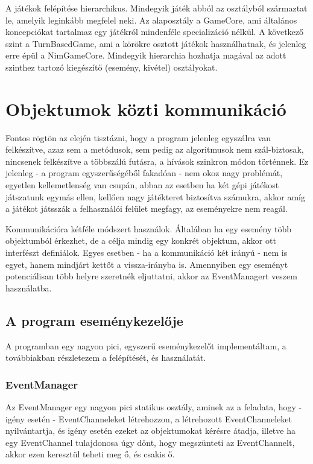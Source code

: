 A játékok felépítése hierarchikus. Mindegyik játék abból az osztályból származtat le, amelyik leginkább megfelel neki. Az alaposztály a GameCore, ami általános koncepciókat tartalmaz egy játékról mindenféle specializáció nélkül. A következő szint a TurnBasedGame, ami a körökre osztott játékok használhatnak, és jelenleg erre épül a NimGameCore. Mindegyik hierarchia hozhatja magával az adott szinthez tartozó kiegészítő (esemény, kivétel) osztályokat.

\section{Objektumok közti kommunikáció}
Fontos rögtön az elején tisztázni, hogy a program jelenleg egyszálra van felkészítve, azaz sem a metódusok, sem pedig az algoritmusok nem szál-biztosak, nincsenek felkészítve a többszálú futásra, a hívások szinkron módon történnek. Ez jelenleg - a program egyszerűségéből fakadóan - nem okoz nagy problémát, egyetlen kellemetlenség van csupán, abban az esetben ha két gépi játékost játszatunk egymás ellen, kellően nagy játékteret biztosítva számukra, akkor amíg a játékot játsszák a felhasználói felület megfagy, az eseményekre nem reagál.\ujsor

Kommunikációra kétféle módszert használok. Általában ha egy esemény több objektumból érkezhet, de a célja mindig egy konkrét objektum, akkor ott interfészt definiálok. Egyes esetben - ha a kommunikáció két irányú - nem is egyet, hanem mindjárt kettőt a vissza-irányba is. Amennyiben egy eseményt potenciálisan több helyre szeretnék eljuttatni, akkor az EventManagert veszem használatba.

\subsection{A program eseménykezelője}
A programban egy nagyon pici, egyszerű eseménykezelőt implementáltam, a továbbiakban részletezem a felépítését, és használatát.

\subsubsection{EventManager}
Az EventManager egy nagyon pici statikus osztály, aminek az a feladata, hogy - igény esetén - EventChanneleket létrehozzon, a létrehozott EventChanneleket nyilvántartja, és igény esetén ezeket az objektumokat kérésre átadja, illetve ha egy EventChannel tulajdonosa úgy dönt, hogy megszünteti az EventChannelt, akkor ezen keresztül teheti meg ő, és csakis ő.

